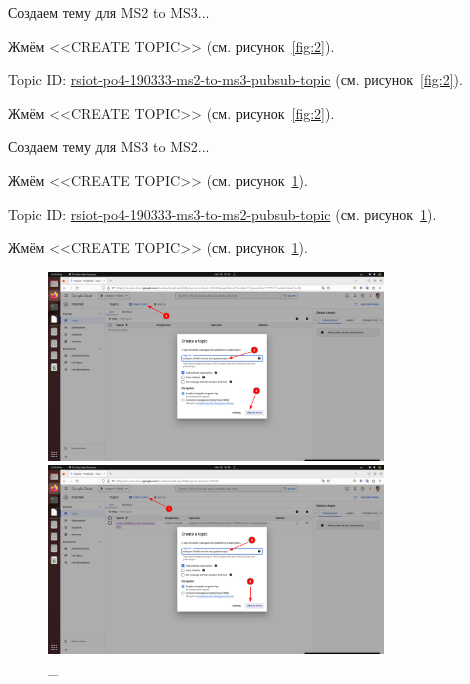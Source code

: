 \documentclass[12pt, a4paper, simple]{eskdtext}
\begin{document}
  Создаем тему для MS2 to MS3...

  Жмём <<CREATE TOPIC>> (см. рисунок~\ref{fig:2}).

  Topic ID: \underline{rsiot-po4-190333-ms2-to-ms3-pubsub-topic} (см. рисунок~\ref{fig:2}).
  
  Жмём <<CREATE TOPIC>> (см. рисунок~\ref{fig:2}).

  Создаем тему для MS3 to MS2...

  Жмём <<CREATE TOPIC>> (см. рисунок~\ref{fig:3}).

  Topic ID: \underline{rsiot-po4-190333-ms3-to-ms2-pubsub-topic} (см. рисунок~\ref{fig:3}).
  
  Жмём <<CREATE TOPIC>> (см. рисунок~\ref{fig:3}).

  \begin{figure}[!h]
    \centering
  
    \begin{minipage}{0.49\textwidth}
      \centering
  
      \includegraphics[height=5cm]
      {images/2023-02-26_16-36-09.png}
  
      \caption{\_}
  
      \label{fig:2}
    \end{minipage}
    \begin{minipage}{0.49\textwidth}
      \centering
  
      \includegraphics[height=5cm]
      {images/2023-02-26_16-38-42.png}
  
      \caption{\_}
  
      \label{fig:3}
    \end{minipage}
  \end{figure}
\end{document}
